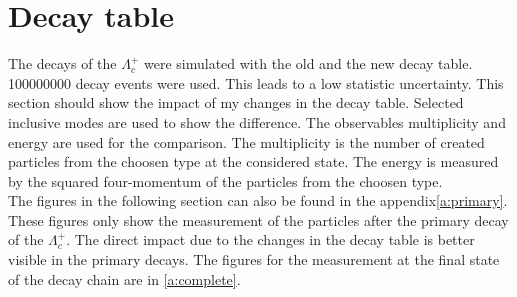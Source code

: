 \section{Decay table}
The decays of the \(\Lambda_c^+\) were simulated with the old and the new 
decay table. 100000000  decay events were used. This leads to a low 
statistic uncertainty. This section should show the impact of my changes in 
the decay table. Selected inclusive modes are used to show the difference. The 
observables multiplicity and energy are used for the comparison. The multiplicity 
is the number of created particles from the choosen type at the considered state. The 
energy is measured by the squared four-momentum of the particles from the choosen type.\\
The figures in the following section can also be found in the appendix{\ref{a:primary}}.
These figures only show the measurement of the particles after the primary 
decay of the \(\Lambda_c^+\). The direct impact due to the changes in the decay 
table is better visible in the primary decays.  The figures for the measurement at the final state 
of the decay chain are in {\ref{a:complete}}.

